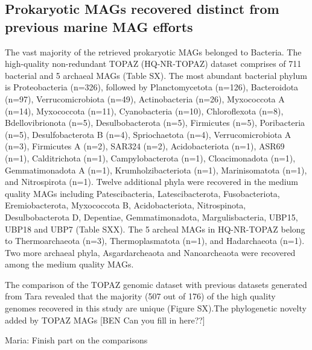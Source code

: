 \documentclass[12pt]{article}
\numberwithin{equation}{section}
\begin{document}
\subsection*{Prokaryotic MAGs recovered distinct from previous marine MAG efforts}
The vast majority of the retrieved prokaryotic MAGs belonged to Bacteria. The high-quality non-redundant TOPAZ (HQ-NR-TOPAZ) dataset comprises of 711 bacterial and 5 archaeal MAGs (Table SX). The most abundant bacterial phylum is Proteobacteria (n=326), followed by Planctomycetota (n=126), Bacteroidota (n=97), Verrucomicrobiota (n=49), Actinobacteria (n=26), Myxococcota A (n=14), Myxococcota (n=11), Cyanobacteria (n=10), Chloroflexota (n=8), Bdellovibrionota (n=5), Desulbobacterota (n=5), Firmicutes (n=5), Poribacteria (n=5), Desulfobacterota B (n=4), Spriochaetota (n=4), Verrucomicrobiota A (n=3), Firmicutes A (n=2), SAR324 (n=2), Acidobacteriota (n=1), ASR69 (n=1), Calditrichota (n=1), Campylobacterota (n=1), Cloacimonadota (n=1), Gemmatimonadota A (n=1), Krumholzibacteriota (n=1), Marinisomatota (n=1), and Nitrospirota (n=1). Twelve additional phyla were recovered in the medium quality MAGs including Patescibacteria, Latescibacterota, Fusobacteriota, Eremiobacterota, Myxococcota B, Acidobacteriota, Nitrospinota, Desulbobacterota D, Depentiae, Gemmatimonadota, Margulisbacteria, UBP15, UBP18 and UBP7 (Table SXX). The 5 archeal MAGs in HQ-NR-TOPAZ belong to Thermoarchaeota (n=3), Thermoplasmatota (n=1), and Hadarchaeota (n=1). Two more archaeal phyla, Asgardarcheaota and Nanoarcheaota were recovered among the medium quality MAGs.

The comparison of the TOPAZ genomic dataset with previous datasets generated from Tara \citep{Tully2018reconstruction, Parks2017Recovery, Delmont2018Nitrogen-fixing} revealed that the majority (507 out of 176) of the high quality genomes recovered in this study are unique (Figure SX).The phylogenetic novelty added by TOPAZ MAGs [BEN Can you fill in here??]

Maria: Finish part on the comparisons
\end{document}
